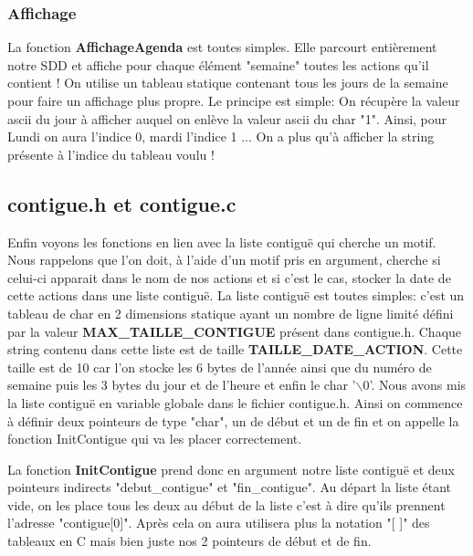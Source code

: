 \documentclass[12pt,french]{article} %
\begin{document}
\subsubsection{Affichage}

La fonction \textbf{AffichageAgenda} est toutes simples. Elle parcourt entièrement notre SDD et affiche pour chaque élément "semaine" toutes les actions qu'il contient ! On utilise un tableau statique contenant tous les jours de la semaine pour faire un affichage plus propre. Le principe est simple: On récupère la valeur ascii du jour à afficher auquel on enlève la valeur ascii du char "1". Ainsi, pour Lundi on aura l'indice 0, mardi l'indice 1 ... On a plus qu'à afficher la string présente à l'indice du tableau voulu !  

\subsection{contigue.h et contigue.c}

Enfin voyons les fonctions en lien avec la liste contiguë qui cherche un motif. Nous rappelons que l'on doit, à l'aide d'un motif pris en argument, cherche si celui-ci apparait dans le nom de nos actions et si c'est le cas, stocker la date de cette actions dans une liste contiguë.\newline
La liste contiguë est toutes simples: c'est un tableau de char en 2 dimensions statique ayant un nombre de ligne limité défini par la valeur \textbf{MAX\_TAILLE\_CONTIGUE} présent dans contigue.h. Chaque string contenu dans cette liste est de taille \textbf{TAILLE\_DATE\_ACTION}. Cette taille est de 10 car l'on stocke les 6 bytes de l'année ainsi que du numéro de semaine puis les 3 bytes du jour et de l'heure et enfin le char '$\backslash$0'. Nous avons mis la liste contiguë en variable globale dans le fichier contigue.h. Ainsi on commence à définir deux pointeurs de type "char", un de début et un de fin et on appelle la fonction InitContigue qui va les placer correctement.\newline

La fonction \textbf{InitContigue} prend donc en argument notre liste contiguë et deux pointeurs indirects "debut\_contigue" et "fin\_contigue". Au départ la liste étant vide, on les place tous les deux au début de la liste c'est à dire qu'ils prennent l'adresse "contigue[0]". Après cela on aura utilisera plus la notation "[ ]" des tableaux en C mais bien juste nos 2 pointeurs de début et de fin.
\end{document}
